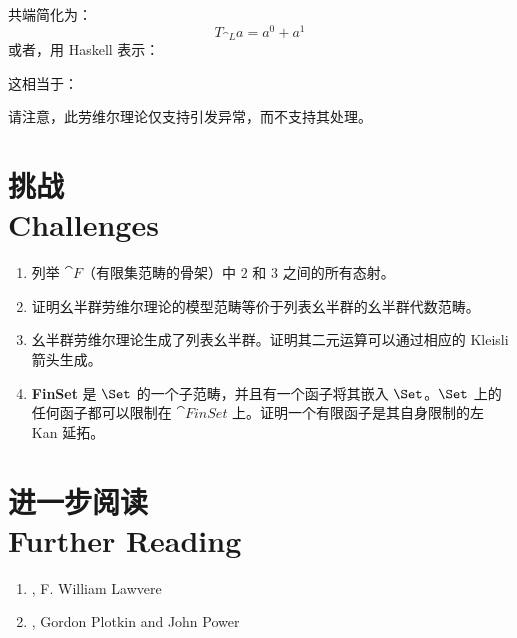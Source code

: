 共端简化为：
\[T_{\cat{L}} a = a^0 + a^1\]
或者，用 Haskell 表示：

这相当于：

请注意，此劳维尔理论仅支持引发异常，而不支持其处理。

\section{挑战\\ \textmd{Challenges}}

\begin{enumerate}
  \tightlist
  \item
  列举 $\cat{F}$（有限集范畴的骨架）中 $2$ 和 $3$ 之间的所有态射。
  \item
  证明幺半群劳维尔理论的模型范畴等价于列表幺半群的幺半群代数范畴。
  \item
  幺半群劳维尔理论生成了列表幺半群。证明其二元运算可以通过相应的 Kleisli 箭头生成。
  \item
  \textbf{FinSet} 是 $\Set$ 的一个子范畴，并且有一个函子将其嵌入 $\Set$。$\Set$ 上的任何函子都可以限制在 $\cat{FinSet}$ 上。证明一个有限函子是其自身限制的左 Kan 延拓。
\end{enumerate}

\section{进一步阅读\\ \textmd{Further Reading}}
\begin{enumerate}
  \tightlist
  \item
  , F. William Lawvere
  \item
  , Gordon Plotkin and John Power
\end{enumerate}
